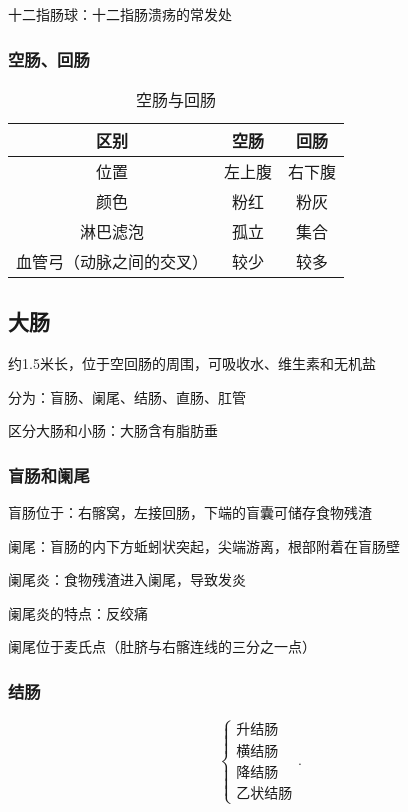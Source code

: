 \begin{notation}
    十二指肠球：十二指肠溃疡的常发处
\end{notation}
\subsubsection{空肠、回肠}%
\label{subsub:肠-回肠-}
\begin{table}[htpb]
    \centering
    \caption{空肠与回肠}
    \label{tab:空肠与回肠}
    \begin{tabular}{ccc}
    \toprule
    区别 & 空肠 & 回肠\\
    \midrule
    位置 & 左上腹 & 右下腹\\
    颜色 & 粉红 & 粉灰\\
    淋巴滤泡 & 孤立 & 集合\\
    血管弓（动脉之间的交叉）& 较少 & 较多\\ 
    \bottomrule
    \end{tabular}
\end{table}
\subsection{大肠}%
\label{sub:大肠}
约1.5米长，位于空回肠的周围，可吸收水、维生素和无机盐

分为：盲肠、阑尾、结肠、直肠、肛管
\begin{notation}
    区分大肠和小肠：大肠含有脂肪垂
\end{notation}
\subsubsection{盲肠和阑尾}%
\label{subsub:肠和阑尾-}
盲肠位于：右髂窝，左接回肠，下端的盲囊可储存食物残渣

阑尾：盲肠的内下方蚯蚓状突起，尖端游离，根部附着在盲肠壁
\begin{notation}
    阑尾炎：食物残渣进入阑尾，导致发炎

    阑尾炎的特点：反绞痛

    阑尾位于麦氏点（肚脐与右髂连线的三分之一点）
\end{notation}
\subsubsection{结肠}%
\label{subsub:肠-}
\[
    \begin{cases}
        \text{升结肠}\\
        \text{横结肠}\\
        \text{降结肠}\\
        \text{乙状结肠}
    \end{cases}
.\] 
